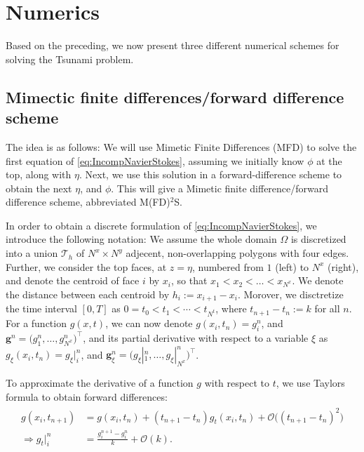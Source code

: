 \documentclass[11pt]{article}
\begin{document}
%
%


\section{Numerics}

Based on the preceding, we now present three different numerical schemes for solving the Tsunami problem.
%
%
\subsection{Mimectic finite differences/forward difference scheme}

The idea is as follows: We will use Mimetic Finite Differences (MFD) \cite{raynaud15} to solve the first equation of \eqref{eq:IncompNavierStokes}, assuming we initially know
$\phi$ at the top, along with $\eta$. Next, we use this solution in a forward-difference scheme to obtain the next $\eta$, and $\phi$. This will give a Mimetic finite
difference/forward difference scheme, abbreviated M(FD)$^2$S.

In order to obtain a discrete formulation of \eqref{eq:IncompNavierStokes}, we introduce the following notation:
We assume the whole domain $\Omega$ is discretized into a union $\mathcal{T}_h$ of $N^x \times N^y$ adjecent, non-overlapping
polygons with four edges. Further, we consider the top faces, at $z = \eta$, numbered from $1$ (left) to $N^x$ (right), and denote
the centroid of face $i$ by $x_i$, so that $x_1 < x_2 < \dots < x_{N^x}$. We denote the distance between each centroid by
$h_i := x_{i+1}-x_i$. Morover, we disctretize the time interval $[0, T]$ as $0 = t_0 < t_1 < \cdots < t_{N^t}$, where $t_{n+1}-t_n := k$ for all $n$.
For a function $g(x,t)$, we can now denote $g(x_i, t_n) = g_i^n$, and $\bm{g}^n = \Big(g_1^n, \dots, g_{N^x}^n\Big)^\top$, and its partial derivative with respect
to a variable $\xi$ as $g_\xi(x_i, t_n) = g_{\xi}|_i^n$, and $\bm{g}_\xi^n = \Big(g_{\xi}|_1^n, \dots, g_{\xi}|_{N^x}^n\Big)^\top$.

To approximate the derivative of a function $g$ with respect to $t$, we use Taylors formula to obtain forward differences:
\begin{align}
    \label{eq:ForwardDiff}
    \begin{aligned}
	    g(x_i, t_{n+1})       & = g(x_i, t_n) +  (t_{n+1}-t_n)g_t(x_i, t_n) + \mathcal{O}\big((t_{n+1}-t_n)^2\big) \\
	    \Rightarrow g_t|_i^n & = \frac{g_i^{n+1}-g_i^n}{k} + \mathcal{O}(k).
	\end{aligned}
\end{align}
\end{document}
